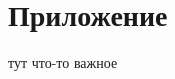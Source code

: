 \documentclass[../main/main.tex]{subfiles}
\begin{document}
\section*{Приложение}

тут что-то важное
\end{document}

